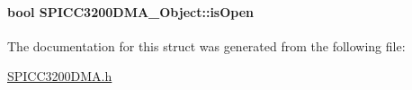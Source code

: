 \paragraph[{is\-Open}]{\setlength{\rightskip}{0pt plus 5cm}bool S\-P\-I\-C\-C3200\-D\-M\-A\-\_\-\-Object\-::is\-Open}\label{struct_s_p_i_c_c3200_d_m_a___object_a77470787fc1b5ff28bed24d4be19b3d2}


The documentation for this struct was generated from the following file\-:\begin{DoxyCompactItemize}
\item 
\hyperlink{_s_p_i_c_c3200_d_m_a_8h}{S\-P\-I\-C\-C3200\-D\-M\-A.\-h}\end{DoxyCompactItemize}
